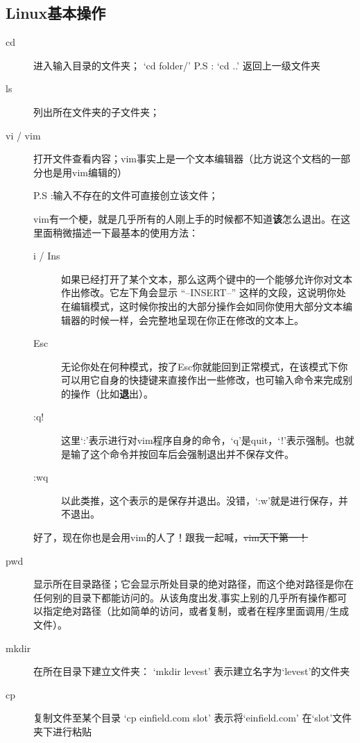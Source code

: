\documentclass{article}
\numberwithin{equation}{section}
\begin{document}
    \subsection{Linux基本操作}
    \begin{description}
    \item[cd]
      进入输入目录的文件夹；
      `cd folder/'
      P.S : `cd ..' 返回上一级文件夹
    \item[ls]
      列出所在文件夹的子文件夹；

    \item[vi / vim]
      打开文件查看内容；vim事实上是一个文本编辑器（比方说这个文档的一部分也是用vim编辑的）

      P.S :输入不存在的文件可直接创立该文件；

    vim有一个梗，就是几乎所有的人刚上手的时候都不知道{\textbf 该怎么退出}。在这里面稍微描述一下最基本的使用方法：
    \begin{description}
      \item[i / Ins] 如果已经打开了某个文本，那么这两个键中的一个能够允许你对文本作出修改。它左下角会显示 ``--INSERT--'' 这样的文段，这说明你处在编辑模式，这时候你按出的大部分操作会如同你使用大部分文本编辑器的时候一样，会完整地呈现在你正在修改的文本上。
      \item[Esc] 无论你处在何种模式，按了Esc你就能回到正常模式，在该模式下你可以用它自身的快捷键来直接作出一些修改，也可输入命令来完成别的操作（比如{\textbf 退出}）。

      \item[:q!] 这里`:'表示进行对vim程序自身的命令，`q'是quit，`!'表示强制。也就是输了这个命令并按回车后会强制退出并不保存文件。

      \item[:wq] 以此类推，这个表示的是保存并退出。没错，`:w'就是进行保存，并不退出。
    \end{description}
    好了，现在你也是会用vim的人了！跟我一起喊，\sout{vim天下第一！}
    \item[pwd]
      显示所在目录路径；它会显示所处目录的绝对路径，而这个绝对路径是你在任何别的目录下都能访问的。从该角度出发,事实上别的几乎所有操作都可以指定绝对路径（比如简单的访问，或者复制，或者在程序里面调用/生成文件）。

    \item[mkdir]
      在所在目录下建立文件夹：
      `mkdir levest' 表示建立名字为`levest'的文件夹

    \item[cp] 复制文件至某个目录
      `cp einfield.com slot' 表示将`einfield.com' 在`slot'文件夹下进行粘贴


\end{description}
\end{document}
